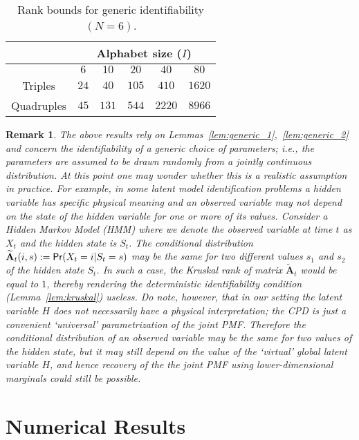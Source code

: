\documentclass[journal]{IEEEtran}
\newtheorem{Remark}{Remark}
\begin{document}
\begin{table}[!t]
\begin{center}
\caption{Rank bounds for generic identifiability $(N=6)$.}
\label{table:Rank_Bound2}
\begin{tabular}{c  c  c  c c c}
&  \multicolumn{5}{c}{Alphabet size ($I$)}      \\
\hline
       		&   $6$ & $10$& $20$ & $40$  & $80$ \\
\hline
Triples     &   $24$ & $40$	& $105$  & $410$ & $1620$  \\
\hline
Quadruples  &   $45$ & $131$	& $544$  & $2220$  & $8966$  \\
\hline
\end{tabular}
\end{center}
\end{table}
\begin{Remark}
\rm
 {
The above results rely on Lemmas~\ref{lem:generic_1},~\ref{lem:generic_2} and concern the identifiability of a generic choice of parameters; i.e., the parameters are assumed to be drawn randomly from a jointly continuous distribution. At this point one may wonder whether this is a realistic assumption in practice. For example, in some latent model identification problems a hidden variable has specific physical meaning and an observed variable may not depend on the state of the hidden variable for one or more of its values. Consider a Hidden Markov Model (HMM) where we denote the observed variable at time $t$ as ${X}_t$ and the hidden state is ${S}_t$. The conditional distribution ${\mathbf{\widetilde{A}}_t(i,s) := {\sf Pr}(X_t = i | S_t = s)}$ may be the same for two different values $s_1$ and $s_2$ of the hidden state $S_t$. In such a case, the Kruskal rank of matrix $\mathbf{\widetilde{A}}_t$ would be equal to $1$, thereby rendering the deterministic identifiability condition (Lemma~\ref{lem:kruskal}) useless. Do note, however, that in our setting the latent variable $H$ does not necessarily have a physical interpretation; the CPD is just a convenient `universal' parametrization of the joint PMF. Therefore the conditional distribution of an observed variable may be the same for two values of the hidden state, but it may still depend on the value of the `virtual' global latent variable $H$, and hence recovery of the the joint PMF using lower-dimensional marginals could still be possible.}
\end{Remark}




\section{Numerical Results}
\label{sec:results}
\end{document}
